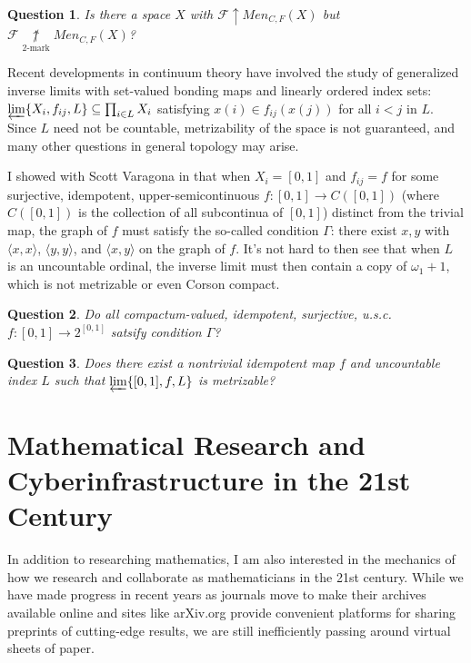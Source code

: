 \documentclass[11pt]{amsart}
\theoremstyle{plain}
\newtheorem{question}{Question}
\newcommand{\win}{\uparrow}
\newcommand{\notkmarkwin}[1]{\underset{#1\text{-mark}}{\not\uparrow}}
\newcommand{\menGame}[1]{Men_{C,F}(#1)}
\newcommand{\<}{\langle}
\renewcommand{\>}{\rangle}
\newcommand{\pl}[1]{\mathscr{#1}}
\begin{document}
\begin{question}
  Is there a space $X$ with $\pl F\win\menGame{X}$ but
  $\pl F\notkmarkwin{2}\menGame{X}$?
\end{question}

Recent developments in continuum theory have involved the study of generalized
inverse limits with set-valued bonding maps and linearly ordered index sets:
$\varprojlim \{X_i,f_{ij},L\}\subseteq \prod_{i\in L}X_i$ satisfying
$x(i)\in f_{ij}(x(j))$ for all $i<j$ in $L$. Since $L$ need not
be countable, metrizability of the space is not guaranteed, and many
other questions in general topology may arise.

I showed
with Scott Varagona in \cite{destroyMetrizability} that when
$X_i=[0,1]$ and $f_{ij}=f$ for some surjective,
idempotent, upper-semicontinuous
$f:[0,1]\to C([0,1])$ (where $C([0,1])$ is the collection of all subcontinua
of $[0,1]$) distinct from the trivial map,
the graph of $f$ must satisfy the so-called condition
$\Gamma$: there exist $x,y$ with $\<x,x\>$, $\<y,y\>$, and $\<x,y\>$ on
the graph of $f$.
It's not hard to then see that when $L$ is an uncountable ordinal,
the inverse limit must then contain a copy of $\omega_1+1$, which
is not metrizable or even Corson compact.

\begin{question}
  Do all compactum-valued, idempotent, surjective, u.s.c. $f:[0,1]\to 2^{[0,1]}$
  satsify condition $\Gamma$?
\end{question}

\begin{question}
  Does there exist a nontrivial idempotent map $f$ and uncountable index $L$
  such that $\varprojlim \{[0,1],f,L\}$ is metrizable?
\end{question}


\section*{Mathematical Research and Cyberinfrastructure in the 21st Century}

In addition to researching mathematics, I am also interested in the mechanics
of how we research and collaborate as mathematicians in the 21st century.
While we have made progress in recent years as journals move to make their
archives available online and sites like arXiv.org provide convenient platforms
for sharing preprints of cutting-edge results, we are still
inefficiently passing around virtual sheets of paper.
\end{document}
